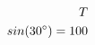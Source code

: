 \documentclass[preview]{standalone}
\begin{document}
\begin{align*}
\special{dvisvgm:raw <g id='unique000'>}T \\sin(30^{\circ}) = 100\special{dvisvgm:raw </g>}
\end{align*}
\end{document}
